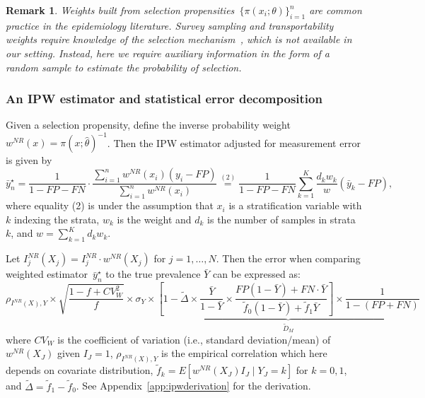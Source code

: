 \documentclass[11pt]{amsart}
\numberwithin{equation}{section}
\theoremstyle{plain}
\newtheorem{remark}{Remark}
\begin{document}
 \begin{remark}
 Weights built from selection propensities~$\{\pi(x_i; \theta)\}_{i=1}^n$ are common practice in the epidemiology literature.  Survey sampling and transportability weights require knowledge of the selection mechanism~\citep{10.1093/aje/kwx164,ColeStuart2010}, which is not available in our setting.  Instead, here we require auxiliary information in the form of a random sample to estimate the probability of selection.
 \end{remark}




 \subsubsection{An IPW estimator and statistical error decomposition}
 \label{section:IPWerrordecomp}

 Given a selection propensity, define the inverse probability weight~$w^{NR}(x) = \pi (x; \hat \theta)^{-1}$. Then the IPW estimator adjusted for measurement error is given by
 \begin{equation}
 \label{eq:ipwest}
 \bar y_n^\star
 = \frac{1}{1-FP-FN} \cdot \frac{\sum_{i=1}^n w^{NR} (x_i) (y_i - FP)}{\sum_{i=1}^n w^{NR} (x_i)}
 \stackrel{(2)}{=} \frac{1}{1-FP-FN} \sum_{k=1}^K \frac{d_k w_k}{w} (\bar y_k - FP),
 \end{equation}
 where equality (2) is under the assumption that $x_i$ is a stratification variable with $k$ indexing the strata, $w_k$ is the weight and $d_k$ is the number of samples in strata $k$, and $w = \sum_{k=1}^K d_k w_k$.

 Let $I_j^{NR} (X_j) = I_j^{NR}  \cdot w^{NR}(X_j)$ for $j=1,\ldots,N$.  Then the error when comparing weighted estimator~$\bar y_n^\star$ to the true prevalence $\bar Y$ can be expressed as:
 \begin{equation}
 \label{eq:statdecomp2}
 \rho_{I^{NR} (X), Y} \times \sqrt{\frac{1-f+ CV^2_W}{f}} \times \sigma_{Y} \times \underbrace{\left[ 1 - \tilde \Delta \times \frac{\bar Y}{1-\bar Y} \times \frac{FP(1-\bar Y) + FN \cdot \bar Y}{\tilde f_0 (1-\bar Y) + \tilde f_1 \bar Y} \right] \times \frac{1}{1-(FP+FN)}}_{\tilde D_M}
 \end{equation}
 where $CV_W$ is the coefficient of variation (i.e., standard deviation/mean) of $w^{NR} (X_J)$ given $I_J = 1$, $\rho_{I^{NR} (X), Y}$ is the empirical correlation which here depends on covariate distribution, $\tilde f_k = E[ w^{NR} (X_J) I_J \mid Y_J = k]$ for $k=0,1$, and $\tilde \Delta = \tilde f_1 - \tilde f_0$.  See Appendix~\ref{app:ipwderivation} for the derivation.
\end{document}
